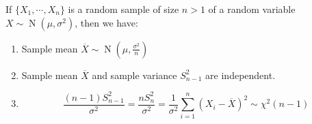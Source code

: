 \documentclass{huhtakm-template-book-v2}
\DeclareMathOperator{\N}{N}
\begin{document}
\begin{thm}
	\label{Chapter 1 (Theorem) Normal and chi-squared distribution related to sample mean and variance}
	If $\{X_{1},\cdots,X_{n}\}$ is a random sample of size $n>1$ of a random variable $X\sim\N(\mu,\sigma^{2})$, then we have:
	\begin{enumerate}
		\item Sample mean $\overline{X}\sim\N(\mu,\frac{\sigma^{2}}{n})$
		\item Sample mean $\overline{X}$ and sample variance $S_{n-1}^{2}$ are independent.
		\item 
		\begin{equation*}
			\frac{(n-1)S_{n-1}^{2}}{\sigma^{2}}=\frac{nS_{n}^{2}}{\sigma^{2}}=\frac{1}{\sigma^{2}}\sum_{i=1}^{n}(X_{i}-\overline{X})^{2}\sim\chi^{2}(n-1)
		\end{equation*}
	\end{enumerate}
\end{thm}
\end{document}
